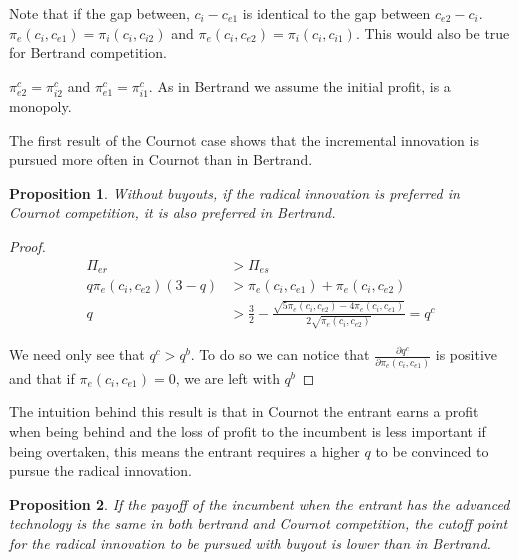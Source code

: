 \documentclass[11pt]{article}
\newtheorem{proposition}{Proposition}
\begin{document}
Note that if the gap between, $c_i-c_{e1}$ is identical to the gap between $c_{e2}-c_i$. $\pi_{e}(c_i,c_{e1})=\pi_{i}(c_{i},c_{i2})$ and $\pi_{e}(c_i,c_{e2})=\pi_{i}(c_{i},c_{i1})$. This would also be true for Bertrand competition. 

$\pi_{e2}^{c}=\pi_{i2}^{c}$ and $\pi_{e1}^{c}=\pi_{i1}^{c}$. As in Bertrand we assume the initial profit, is a monopoly. 

The first result of the Cournot case shows that the incremental innovation is pursued more often in Cournot than in Bertrand. 

\begin{proposition}
Without buyouts, if the radical innovation is preferred in Cournot competition, it is also preferred in Bertrand. 
\end{proposition}

\begin{proof}
\begin{align*}
\Pi_{er}&>\Pi_{es} \\
q \pi_{e}(c_i,c_{e2}) (3-q) &> \pi_{e}(c_i,c_{e1})+\pi_{e}(c_i,c_{e2}) \\
q&> 
 \frac{3}{2}-\frac{ \sqrt{5 \pi_{e}(c_i,c_{e2})-4 \pi_{e}(c_i,c_{e1})}}{2 \sqrt{\pi_{e}(c_i,c_{e2})}}=q^{c}
\end{align*}

We need only see that $q^{c}>q^{b}$. To do so we can notice that $\frac{\partial q^c}{\partial \pi_{e}(c_i,c_{e1}) }$ is positive and that if $\pi_{e}(c_i,c_{e1})=0$, we are left with $q^{b}$
\end{proof}

The intuition behind this result is that in Cournot the entrant earns a profit when being behind and the loss of profit to the incumbent is less important if being overtaken, this means the entrant requires a higher $q$ to be convinced to pursue the radical innovation.  

\begin{proposition}
If the payoff of the incumbent when the entrant has the advanced technology is the same in both bertrand and Cournot competition, the cutoff point for the radical innovation to be pursued with buyout is lower than in Bertrand. 
\end{proposition}
\end{document}
